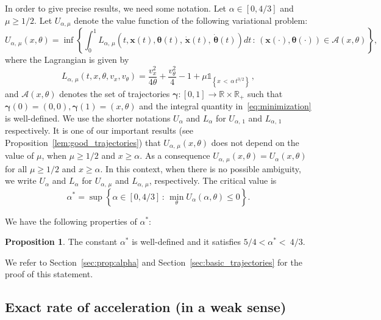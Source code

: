 \documentclass[10pt]{amsart}
\theoremstyle{definition}\newtheorem{defi}[theo]{Definition}\newtheorem{rema}[theo]{Remark}\newtheorem{exam}[theo]{Example}\newtheorem{exem}[theo]{Example}\newtheorem{nota}[theo]{Notation}
\newcommand{\R}{\mathbb{R}}
\newcommand{\bx}{\mathbf{x}}
\newcommand{\mA}{\mathcal{A}}
\newcommand{\bgamma}{\boldsymbol \gamma}
\newcommand{\btheta}{\boldsymbol{\theta}}
\newcommand{\1}{\mathds{1}}
\newtheorem{proposition}[theo]{Proposition}\newtheorem{lemma}[theo]{Lemma}\newtheorem{remark}[theo]{Remark}
\begin{document}
In order to give precise results, we need some notation. Let $\alpha\in[0,4/3]$ and $\mu \geq 1/2$. Let $U_{\alpha,\mu}$ denote the value function of the following variational problem:
\begin{equation}\label{eq:minimization}
U_{\alpha,\,\mu}(x,\theta) = \inf \left\{ \int_0^1 L_{\alpha,\,\mu}\left(t,\bx(t),\btheta(t),\,\dot{\bx}(t),\,\dot{\btheta}(t)\right)dt\,:\,\left(\bx(\cdot),\btheta(\cdot)\right) \in \mA(x,\theta)\right\},
\end{equation}
where the Lagrangian is given by
\begin{equation}\label{eq:lagrangian16}
L_{\alpha,\,\mu}\left(t,x,\theta,v_x,v_\theta\right) = \frac{v_x^2}{4 \theta} + \frac{v_\theta^2}{4} - 1 + \mu \1_{\left\{ x\,<\,\alpha\,t^{3/2}\right\}}\,,
\end{equation}
and $\mA(x,\theta)$ denotes the set of trajectories $\bgamma: [0,1] \to \R\times \R_+$ such that $\bgamma(0) = (0,0), \bgamma(1) = (x,\theta)$ and the integral quantity in~\eqref{eq:minimization} is well-defined. We use the shorter notations $U_\alpha$ and $L_\alpha$ for $U_{\alpha,\,1}$ and $L_{\alpha,\,1}$ respectively. It is one of our important results (see Proposition~\ref{lem:good_trajectories}) that $U_{\alpha,\,\mu}(x, \theta)$ does not depend on the value of $\mu$, when $\mu\geq 1/2$ and $x\geq \alpha$. As a consequence $U_{\alpha,\,\mu}(x, \theta)=U_{\alpha}(x, \theta)$ for all $\mu\geq 1/2$ and $x\geq \alpha$. In this context, when there is no possible ambiguity, we write $U_\alpha$ and $L_\alpha$ for $U_{\alpha,\,\mu}$ and $L_{\alpha,\,\mu}$, respectively. The critical value is
\begin{equation}\label{eq:alpha^*}
\alpha^* = \sup\left\{ \alpha \in [0,4/3]\,:\,\min_\theta U_\alpha(\alpha, \theta) \leq 0\right\}.
\end{equation}

We have the following properties of $\alpha^*$:
\begin{proposition}\label{prop:alpha}
The constant $\alpha^*$ is well-defined and it satisfies $5/4 < \alpha^*<~4/3$.
\end{proposition}

We refer to Section~\ref{sec:prop:alpha} and Section~\ref{sec:basic_trajectories} for the proof of this statement.

\subsection*{Exact rate of acceleration (in a weak sense)}
\end{document}
